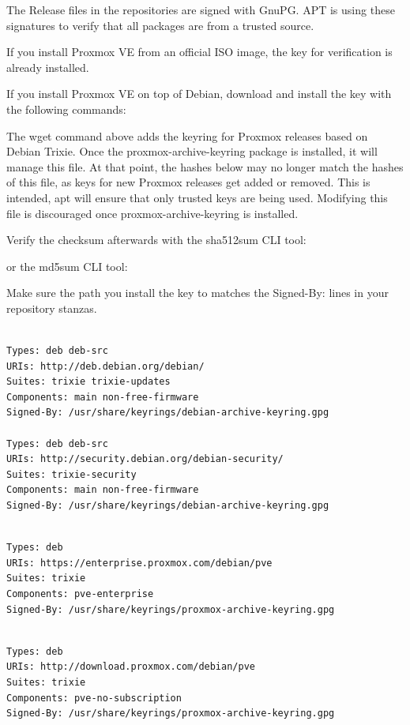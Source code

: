 The Release files in the repositories are signed with GnuPG. APT is using these signatures to verify that all packages are from a trusted source.

If you install Proxmox VE from an official ISO image, the key for verification is already installed.

If you install Proxmox VE on top of Debian, download and install the key with the following commands:

The wget command above adds the keyring for Proxmox releases based on Debian Trixie. Once the proxmox-archive-keyring package is installed, it will manage this file. At that point, the hashes below may no longer match the hashes of this file, as keys for new Proxmox releases get added or removed. This is intended, apt will ensure that only trusted keys are being used. Modifying this file is discouraged once proxmox-archive-keyring is installed.

Verify the checksum afterwards with the sha512sum CLI tool:

or the md5sum CLI tool:

Make sure the path you install the key to matches the Signed-By: lines in your repository stanzas.

\begin{lstlisting}

Types: deb deb-src
URIs: http://deb.debian.org/debian/
Suites: trixie trixie-updates
Components: main non-free-firmware
Signed-By: /usr/share/keyrings/debian-archive-keyring.gpg

Types: deb deb-src
URIs: http://security.debian.org/debian-security/
Suites: trixie-security
Components: main non-free-firmware
Signed-By: /usr/share/keyrings/debian-archive-keyring.gpg

\end{lstlisting}

\begin{lstlisting}

Types: deb
URIs: https://enterprise.proxmox.com/debian/pve
Suites: trixie
Components: pve-enterprise
Signed-By: /usr/share/keyrings/proxmox-archive-keyring.gpg

\end{lstlisting}

\begin{lstlisting}

Types: deb
URIs: http://download.proxmox.com/debian/pve
Suites: trixie
Components: pve-no-subscription
Signed-By: /usr/share/keyrings/proxmox-archive-keyring.gpg

\end{lstlisting}

